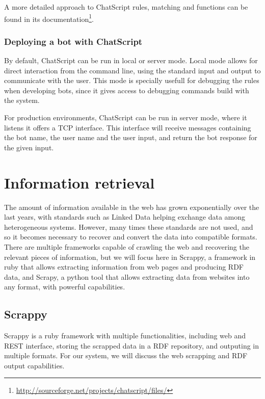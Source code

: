 A more detailed approach to ChatScript rules, matching and functions can be found in its documentation\footnote{\url{http://sourceforge.net/projects/chatscript/files/}}.

\subsubsection{Deploying a bot with ChatScript}

By default, ChatScript can be run in local or server mode. Local mode allows for direct interaction from the command line, using the standard input and output to communicate with the user. This mode is specially usefull for debugging the rules when developing bots, since it gives access to debugging commands build with the system.

For production environments, ChatScript can be run in server mode, where it listens it offers a TCP interface. This interface will receive messages containing the bot name, the user name and the user input, and return the bot response for the given input.

\section{Information retrieval}

The amount of information available in the web has grown exponentially over the last years, with standards such as Linked Data helping exchange data among heterogeneous systems. However, many times these standards are not used, and so it becomes necessary to recover and convert the data into compatible formats. There are multiple frameworks capable of crawling the web and recovering the relevant pieces of information, but we will focus here in Scrappy, a framework in ruby that allows extracting information from web pages and producing RDF data, and Scrapy, a python tool that allows extracting data from websites into any format, with powerful capabilities.


\subsection{Scrappy}

Scrappy\cite{villamor13} is a ruby framework with multiple functionalities, including web and REST interface, storing the scrapped data in a RDF repository, and outputing in multiple formats. For our system, we will discuss the web scrapping and RDF output capabilities.

